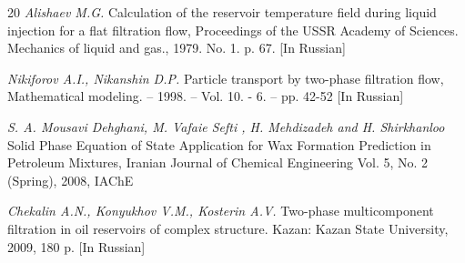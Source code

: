 \documentclass[
11pt,%
tightenlines,%
twoside,%
onecolumn,%
nofloats,%
nobibnotes,%
nofootinbib,%
superscriptaddress,%
noshowpacs,%
centertags]%
{revtex4-2}
\begin{document}
\begin{thebibliography}{20}
\textit{Alishaev M.G.} Calculation of the reservoir temperature field during liquid injection for a flat filtration flow, Proceedings of the USSR Academy of Sciences. Mechanics of liquid and gas., 1979. No. 1. p. 67.  [In Russian]

\textit {Nikiforov A.I., Nikanshin D.P.} Particle transport by two-phase filtration flow, Mathematical modeling. – 1998. – Vol. 10. - 6. – pp. 42-52 [In Russian]

\textit {S. A. Mousavi Dehghani, M. Vafaie Sefti , H. Mehdizadeh and H. Shirkhanloo} Solid Phase Equation of State Application for Wax Formation Prediction in Petroleum Mixtures, Iranian Journal of Chemical Engineering Vol. 5, No. 2 (Spring), 2008, IAChE

\textit{Chekalin A.N., Konyukhov V.M., Kosterin A.V.} Two-phase multicomponent filtration in oil reservoirs of complex structure. Kazan: Kazan State University, 2009, 180 p.  [In Russian]


\end{thebibliography}
\end{document}
